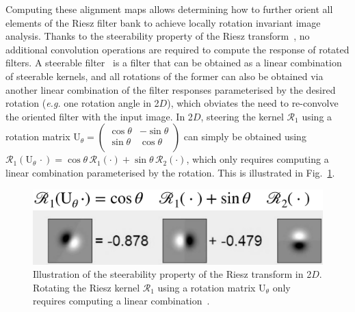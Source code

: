 \documentclass[fleqn,a4paper,oneside,openany]{book}
\begin{document}
Computing these alignment maps allows determining how to further orient all elements of the Riesz filter bank to achieve locally rotation invariant image analysis.
Thanks to the steerability property of the Riesz transform~\cite{UnV2010}, no additional convolution operations are required to compute the response of rotated filters.
A steerable filter~\cite{FrA1991} is a filter that can be obtained as a linear combination of steerable kernels, and all rotations of the former can also be obtained via another linear combination of the filter responses parameterised by the desired rotation (\textit{e.g.} one rotation angle in 2$D$), which obviates the need to re-convolve the oriented filter with the input image.
In 2$D$, steering the kernel $\mathcal{R}_1$ using a rotation matrix 
$\mathrm{U}_\theta
=\begin{pmatrix} 
\cos{\theta} & -\sin{\theta} \\
\sin{\theta} & \cos{\theta} \\
\end{pmatrix}
$ can simply be obtained using
$\mathcal{R}_1(\mathrm{U}_{\theta}\,\cdot)=\cos\theta\,\mathcal{R}_1(\cdot)+\sin\theta\,\mathcal{R}_2(\cdot)$, which only requires computing a linear combination parameterised by the rotation.
This is illustrated in Fig.~\ref{fig:2dsteerability}.
%
\begin{figure}
\centering
\includegraphics[trim = 0 0 0 0, clip, width=0.5\linewidth]{2dsteerability.png}
\caption{Illustration of the steerability property of the Riesz transform in 2$D$. Rotating the Riesz kernel $\mathcal{R}_1$ using a rotation matrix $\mathrm{U}_\theta$ only requires computing a linear combination~\cite{UnV2010}.}
  \label{fig:2dsteerability}
\end{figure}
%
\end{document}
